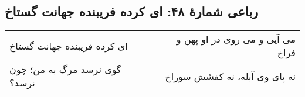 \begin{center}
\section*{رباعی شمارهٔ ۴۸: ای کرده فریبنده جهانت گستاخ}
\label{sec:048}
\begin{longtable}{l p{0.5cm} r}
ای کرده فریبنده جهانت گستاخ
&&
می آیی و می روی در او پهن و فراخ
\\
گوی نرسد مرگ به من؛ چون نرسد؟
&&
نه پای وی آبله، نه کفشش سوراخ
\\
\end{longtable}
\end{center}
